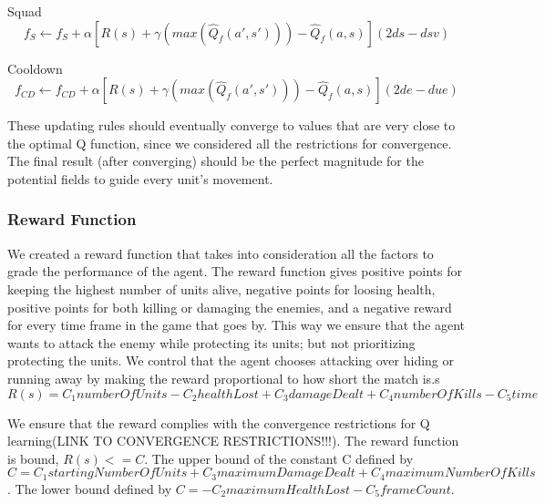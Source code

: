 \begin{flushleft}
Squad 
\begin{equation}
f_{S}  \leftarrow f_{S}  + \alpha [ R(s) + \gamma (max(\hat{Q}_{f} (a',s')))-\hat{Q}_{f} (a,s) ] (2ds - dsv)
\end{equation}
\end{flushleft} 

\begin{flushleft}
Cooldown
\begin{equation}
f_{CD}  \leftarrow f_{CD}  + \alpha [ R(s) + \gamma (max(\hat{Q}_{f} (a',s')))-\hat{Q}_{f} (a,s) ](2de - due)
\end{equation}
\end{flushleft} 


These updating rules should eventually converge to values that are very close to the optimal Q function, since we considered all the restrictions for convergence. The final result (after converging) should be the perfect magnitude for the potential fields to guide every unit's movement.

\subsubsection{Reward Function} \label{reward}

We created a reward function that takes into consideration all the factors to grade the performance of the agent. The reward function gives positive points for keeping the highest number of units alive, negative points for loosing health, positive points for both killing or damaging the enemies, and a negative reward for every time frame in the game that goes by. This way we ensure that the agent wants to attack the enemy while protecting its units; but not prioritizing protecting the units. We control that the agent chooses attacking over hiding or running away by making the reward proportional to how short the match is.s
\begin{equation}
R(s) = C_1 numberOfUnits  -  C_2 healthLost  +   C_3 damageDealt  +   C_4 numberOfKills -  C_5 time
\end{equation}

We ensure that the reward complies with the convergence restrictions for Q learning(LINK TO CONVERGENCE RESTRICTIONS!!!). The reward function is bound, $R(s) <= C$. The upper bound of the constant C defined by $C = C_1 startingNumberOfUnits  +   C_3 maximumDamageDealt  +   C_4 maximumNumberOfKills$. The lower bound defined by $C = -  C_2 maximumHealthLost -  C_5 frameCount$. 

